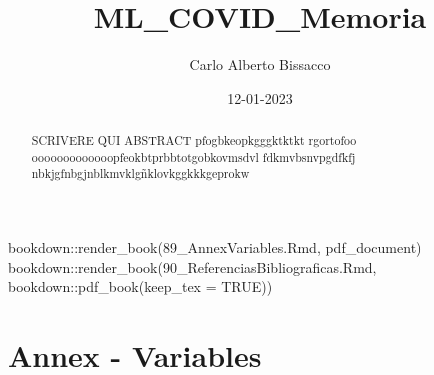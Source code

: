 \documentclass[
]{article}
\title{ML\_COVID\_Memoria}
\author{Carlo Alberto Bissacco}
\date{12-01-2023}
\newenvironment{Shaded}{\begin{snugshade}}{\end{snugshade}}
\newcommand{\AttributeTok}[1]{\textcolor[rgb]{0.77,0.63,0.00}{#1}}
\newcommand{\ConstantTok}[1]{\textcolor[rgb]{0.00,0.00,0.00}{#1}}
\newcommand{\FunctionTok}[1]{\textcolor[rgb]{0.00,0.00,0.00}{#1}}
\newcommand{\NormalTok}[1]{#1}
\newcommand{\SpecialCharTok}[1]{\textcolor[rgb]{0.00,0.00,0.00}{#1}}
\newcommand{\StringTok}[1]{\textcolor[rgb]{0.31,0.60,0.02}{#1}}
\begin{document}
\maketitle
\begin{abstract}
SCRIVERE QUI ABSTRACT pfogbkeopkgggktktkt rgortofoo
ooooooooooooopfeokbtprbbtotgobkovmsdvl fdkmvbsnvpgdfkfj
nbkjgfnbgjnblkmvklgñklovkggkkkgeprokw
\end{abstract}

{
\hypersetup{linkcolor=}
\setcounter{tocdepth}{2}
\tableofcontents
}
\begin{Shaded}
\begin{Highlighting}[]
\NormalTok{bookdown}\SpecialCharTok{::}\FunctionTok{render\_book}\NormalTok{(}\StringTok{\textquotesingle{}89\_AnnexVariables.Rmd\textquotesingle{}}\NormalTok{, pdf\_document)}
\NormalTok{bookdown}\SpecialCharTok{::}\FunctionTok{render\_book}\NormalTok{(}\StringTok{\textquotesingle{}90\_ReferenciasBibliograficas.Rmd\textquotesingle{}}\NormalTok{, bookdown}\SpecialCharTok{::}\FunctionTok{pdf\_book}\NormalTok{(}\AttributeTok{keep\_tex =} \ConstantTok{TRUE}\NormalTok{))}
\end{Highlighting}
\end{Shaded}

\pagebreak

\hypertarget{annex---variables}{%
\section{Annex - Variables}\label{annex---variables}}
\end{document}
